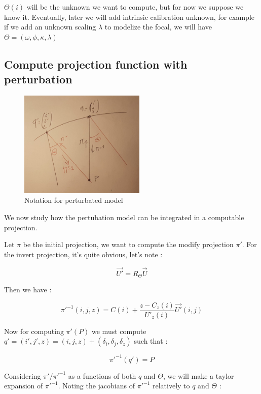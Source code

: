 $\Theta(i)$ will be the unknown we want to compute, but for now
we suppose we know it.  Eventually, later we will add intrinsic calibration
unknown, for example if we add an unknown scaling $\lambda$ to modelize the focal, we will 
have $\Theta=(\omega,\phi,\kappa, \lambda)$


\subsection{Compute projection function with perturbation}

\begin{figure}
\centering
\includegraphics[width=6cm]{Methods/Images/PushB2.jpg}\caption{Notation for perturbated model}
        \label{fig:PushB2}
\end{figure}

We now study how the pertubation model can be integrated in a
computable projection.

Let $\pi$ be the initial projection, we want to compute the modify
projection $\pi'$.
For the invert projection, it's quite obvious, let's note  :

\begin{equation}
    \vec{U'} =  R_\Theta \vec{U}
\end{equation}

Then we have :

\begin{equation}
	\pi'^{-1}(i,j,z) = C(i) + \frac{z-C_z(i)}{U'_z(i)} \vec{U'}(i,j)
\end{equation}


Now for computing $\pi'(P)$ we must compute $q'=(i',j',z)=(i,j,z)+(\delta_i,\delta_j,\delta_z)$ such that :

\begin{equation}
        \pi'^{-1}(q') = P
\end{equation}

Considering $\pi'/\pi'^{-1}$ as a functions of both $q$ and $\Theta$,  we will make a taylor expansion 
of $\pi'^{-1}$. Noting  the jacobians of $\pi'^{-1}$ relatively to $q$ and $\Theta$ :

